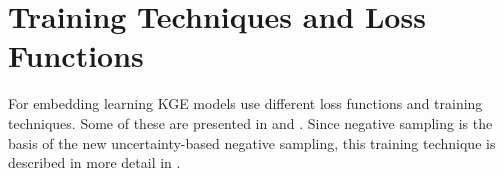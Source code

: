 \section{Training Techniques and Loss Functions}
\label{sec:training_techniques_and_loss_functions}
%
For embedding learning \ac{KGE} models use different loss functions and training techniques.
Some of these are presented in  and .
Since negative sampling is the basis of the new uncertainty-based negative sampling, this training technique is described in more detail in .
%

%

%
